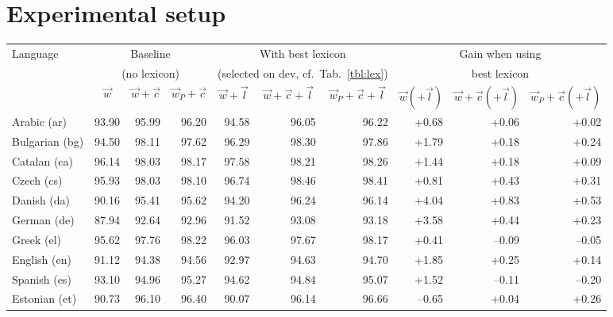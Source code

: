 \documentclass[11pt,a4paper]{article}
\begin{document}

\section{Experimental setup}

\begin{table}[t]
\centering\scriptsize
\begin{tabular}{l|rrr|rrr|rrr}
\toprule
Language & \multicolumn{3}{c|}{Baseline} & \multicolumn{3}{c|}{With best lexicon} & \multicolumn{3}{c}{Gain when using} \\
 & \multicolumn{3}{c|}{(no lexicon)} & \multicolumn{3}{c|}{(selected on dev, cf.~Tab.~\ref{tbl:lex})} & \multicolumn{3}{c}{best lexicon} \\
 & \multicolumn{1}{c}{$\vec{w}$} & \multicolumn{1}{c}{$\vec{w}+\vec{c}$} & \multicolumn{1}{c|}{$\vec{w}_P+\vec{c}$} & \multicolumn{1}{c}{$\vec{w}+\vec{l}$} & \multicolumn{1}{c}{$\vec{w}+\vec{c}+\vec{l}$} & \multicolumn{1}{c|}{$\vec{w}_P+\vec{c}+\vec{l}$} & \multicolumn{1}{c}{$\vec{w}(+\vec{l})$} & \multicolumn{1}{c}{$\vec{w}+\vec{c}(+\vec{l})$} & \multicolumn{1}{c}{$\vec{w}_P+\vec{c}(+\vec{l})$} \\
\midrule
Arabic (ar) & 93.90 & 95.99 & 96.20 & 94.58 & 96.05 & 96.22 & +0.68 & +0.06 & +0.02\\
Bulgarian (bg) & 94.50 & 98.11 & 97.62 & 96.29 & 98.30 & 97.86 & +1.79 & +0.18 & +0.24\\
Catalan (ca) & 96.14 & 98.03 & 98.17 & 97.58 & 98.21 & 98.26 & +1.44 & +0.18 & +0.09\\
Czech (cs) & 95.93 & 98.03 & 98.10 & 96.74 & 98.46 & 98.41 & +0.81 & +0.43 & +0.31\\
Danish (da) & 90.16 & 95.41 & 95.62 & 94.20 & 96.24 & 96.14 & +4.04 & +0.83 & +0.53\\
German (de) & 87.94 & 92.64 & 92.96 & 91.52 & 93.08 & 93.18 & +3.58 & +0.44 & +0.23\\
Greek (el) & 95.62 & 97.76 & 98.22 & 96.03 & 97.67 & 98.17 & +0.41 & --0.09 & --0.05\\
English (en) & 91.12 & 94.38 & 94.56 & 92.97 & 94.63 & 94.70 & +1.85 & +0.25 & +0.14\\
Spanish (es) & 93.10 & 94.96 & 95.27 & 94.62 & 94.84 & 95.07 & +1.52 & --0.11 & --0.20\\
Estonian (et) & 90.73 & 96.10 & 96.40 & 90.07 & 96.14 & 96.66 & --0.65 & +0.04 & +0.26\\

\end{tabular}
\end{table}
\end{document}

